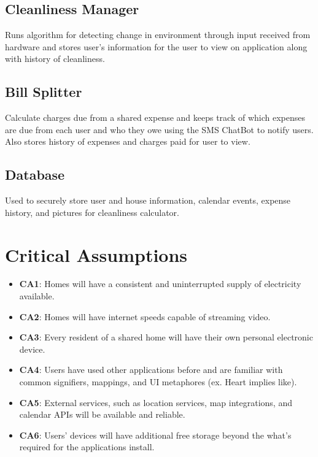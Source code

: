 \documentclass{article}
\begin{document}
\subsection{Cleanliness Manager}
Runs algorithm for detecting change in environment through input received from hardware and stores user's information for the user to view on application along with history of cleanliness.

\subsection{Bill Splitter}
Calculate charges due from a shared expense and keeps track of which expenses are due from each user and who they owe using the SMS ChatBot to notify users. Also stores history of expenses and charges paid for user to view.

\subsection{Database}
Used to securely store user and house information, calendar events, expense history, and pictures for cleanliness calculator.


\section{Critical Assumptions}

\begin{itemize}
\item \textbf{CA1}: Homes will have a consistent and uninterrupted supply of electricity available.
\item \textbf{CA2}: Homes will have internet speeds capable of streaming video.
\item \textbf{CA3}: Every resident of a shared home will have their own personal electronic device.
\item \textbf{CA4}: Users have used other applications before and are familiar with common signifiers, mappings, and UI metaphores (ex. Heart implies like).
\item \textbf{CA5}: External services, such as location services, map integrations, and calendar APIs will be available and reliable.
\item \textbf{CA6}: Users' devices will have additional free storage beyond the what's required for the applications install.
\end{itemize}

\newpage

\end{document}
